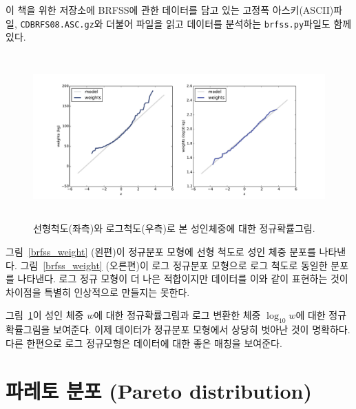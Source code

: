 이 책을 위한 저장소에 BRFSS에 관한 데이터를 담고 있는 고정폭 아스키(ASCII)파일, {\tt CDBRFS08.ASC.gz}와 더불어 파일을 읽고 데이터를 분석하는 {\tt brfss.py}파일도 함께 있다.

\begin{figure}
\centerline{
\includegraphics[height=2.5in]{figs/brfss_weight_normal.pdf}}
\caption{선형척도(좌측)와 로그척도(우측)로 본 성인체중에 대한 정규확률그림.}
\label{brfss_weight_normal}
\end{figure}

그림~\ref{brfss_weight} (왼편)이 정규분포 모형에 선형 척도로 성인 체중 분포를 나타낸다.
그림~\ref{brfss_weight} (오른편)이 로그 정규분포 모형으로 로그 척도로 동일한 분포를 나타낸다.
로그 정규 모형이 더 나은 적합이지만 데이터를 이와 같이 표현하는 것이 차이점을 특별히 인상적으로 만들지는 못한다.

그림~\ref{brfss_weight_normal}이 성인 체중 $w$에 대한 정규확률그림과 
로그 변환한 체중 $\log_{10} w$에 대한 정규확률그림을 보여준다.
이제 데이터가 정규분포 모형에서 상당히 벗아난 것이 명확하다.
다른 한편으로 로그 정규모형은 데이터에 대한 좋은 매칭을 보여준다.



\section{파레토 분포 (Pareto distribution)}

